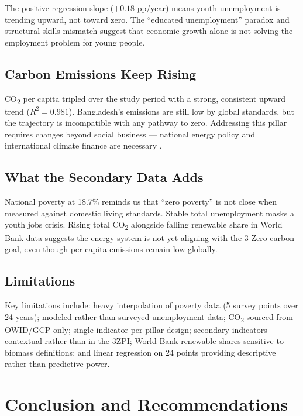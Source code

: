 \documentclass[12pt,a4paper]{article}
\begin{document}
The positive regression slope ($+0.18$ pp/year) means youth unemployment is trending upward, not toward zero. The ``educated unemployment'' paradox and structural skills mismatch \citep{selim2021youth} suggest that economic growth alone is not solving the employment problem for young people.

\subsection{Carbon Emissions Keep Rising}

CO\textsubscript{2} per capita tripled over the study period with a strong, consistent upward trend ($R^2 = 0.981$). Bangladesh's emissions are still low by global standards, but the trajectory is incompatible with any pathway to zero. Addressing this pillar requires changes beyond social business --- national energy policy and international climate finance are necessary \citep{stern2007}.

\subsection{What the Secondary Data Adds}

National poverty at 18.7\% reminds us that ``zero poverty'' is not close when measured against domestic living standards. Stable total unemployment masks a youth jobs crisis. Rising total CO\textsubscript{2} alongside falling renewable share in World Bank data suggests the energy system is not yet aligning with the 3 Zero carbon goal, even though per-capita emissions remain low globally.

\subsection{Limitations}

Key limitations include: heavy interpolation of poverty data (5 survey points over 24 years); modeled rather than surveyed unemployment data; CO\textsubscript{2} sourced from OWID/GCP only; single-indicator-per-pillar design; secondary indicators contextual rather than in the 3ZPI; World Bank renewable shares sensitive to biomass definitions; and linear regression on 24 points providing descriptive rather than predictive power.

\section{Conclusion and Recommendations}
\end{document}
